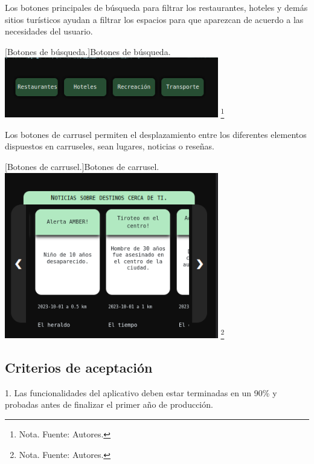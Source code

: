 Los botones principales de búsqueda para filtrar los restaurantes, hoteles y demás sitios turísticos ayudan a filtrar los espacios para que aparezcan de acuerdo a las necesidades del usuario.

\vspace{2mm}
\begin{minipage}{0.9\textwidth}
\centering
{}[{Botones de búsqueda.}]{Botones de búsqueda.}
\label{ManualBotonesBusqueda}
\includegraphics[width=0.7\textwidth]{Content/Images/ManualBotonesDeBusqueda.png}
\footnote{Nota. \textup{Fuente: Autores.}}
\end{minipage}

Los botones de carrusel permiten el desplazamiento entre los diferentes elementos dispuestos en carruseles, sean lugares, noticias o reseñas.

\vspace{2mm}
\begin{minipage}{0.9\textwidth}
\centering
{}[{Botones de carrusel.}]{Botones de carrusel.}
\label{ManualBotonesCarrusel}
\includegraphics[width=0.7\textwidth]{Content/Images/ManualFlechasCarrusel.png}
\footnote{Nota. \textup{Fuente: Autores.}}
\end{minipage}

\subsection{Criterios de aceptación}

1. Las funcionalidades del aplicativo deben estar terminadas en un 90\% y probadas antes de finalizar el primer año de producción.


